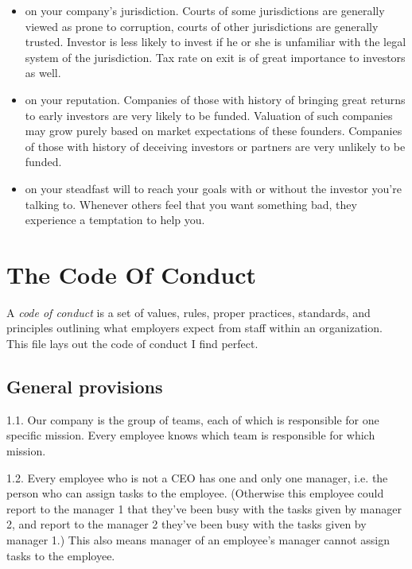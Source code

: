 \documentclass[11pt]{article}
\theoremstyle{remark}
\theoremstyle{definition}
\begin{document}
\begin{itemize}
\item on your company's jurisdiction. Courts of some jurisdictions are generally viewed as prone to corruption, courts of other jurisdictions are generally trusted. Investor is less likely to invest if he or she is unfamiliar with the legal system of the jurisdiction. Tax rate on exit is of great importance to investors as well.







\item on your reputation. Companies of those with history of bringing great returns to early investors are very likely to be funded. Valuation of such companies may grow purely based on market expectations of these founders. Companies of those with history of deceiving investors or partners are very unlikely to be funded. 






\item on your steadfast will to reach your goals with or without the investor you're talking to. Whenever others feel that you want something bad, they experience a temptation to help you.







\end{itemize}



\section{The Code Of Conduct}


A \textit{code of conduct} is a set of values, rules, proper practices, standards, and principles outlining what employers expect from staff within an organization. This file lays out the code of conduct I find perfect.



\subsection{General provisions}


\item[1.1.] Our company is the group of teams, each of which is responsible for one specific mission. Every employee knows which team is responsible for which mission.

\item[1.2.] Every employee who is not a CEO has one and only one manager, i.e. the person who can assign tasks to the employee. (Otherwise this employee could report to the manager 1 that they've been busy with the tasks given by manager 2, and report to the manager 2 they've been busy with the tasks given by manager 1.) This also means manager of an employee's manager cannot assign tasks to the employee.
\end{document}
